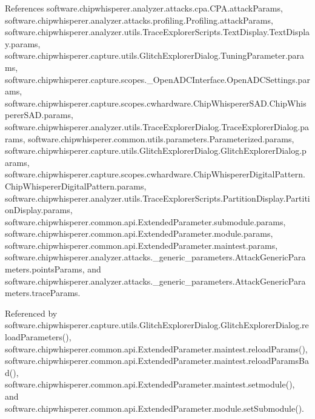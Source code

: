 References software.\+chipwhisperer.\+analyzer.\+attacks.\+cpa.\+C\+P\+A.\+attack\+Params, software.\+chipwhisperer.\+analyzer.\+attacks.\+profiling.\+Profiling.\+attack\+Params, software.\+chipwhisperer.\+analyzer.\+utils.\+Trace\+Explorer\+Scripts.\+Text\+Display.\+Text\+Display.\+params, software.\+chipwhisperer.\+capture.\+utils.\+Glitch\+Explorer\+Dialog.\+Tuning\+Parameter.\+params, software.\+chipwhisperer.\+capture.\+scopes.\+\_\+\+Open\+A\+D\+C\+Interface.\+Open\+A\+D\+C\+Settings.\+params, software.\+chipwhisperer.\+capture.\+scopes.\+cwhardware.\+Chip\+Whisperer\+S\+A\+D.\+Chip\+Whisperer\+S\+A\+D.\+params, software.\+chipwhisperer.\+analyzer.\+utils.\+Trace\+Explorer\+Dialog.\+Trace\+Explorer\+Dialog.\+params, software.\+chipwhisperer.\+common.\+utils.\+parameters.\+Parameterized.\+params, software.\+chipwhisperer.\+capture.\+utils.\+Glitch\+Explorer\+Dialog.\+Glitch\+Explorer\+Dialog.\+params, software.\+chipwhisperer.\+capture.\+scopes.\+cwhardware.\+Chip\+Whisperer\+Digital\+Pattern.\+Chip\+Whisperer\+Digital\+Pattern.\+params, software.\+chipwhisperer.\+analyzer.\+utils.\+Trace\+Explorer\+Scripts.\+Partition\+Display.\+Partition\+Display.\+params, software.\+chipwhisperer.\+common.\+api.\+Extended\+Parameter.\+submodule.\+params, software.\+chipwhisperer.\+common.\+api.\+Extended\+Parameter.\+module.\+params, software.\+chipwhisperer.\+common.\+api.\+Extended\+Parameter.\+maintest.\+params, software.\+chipwhisperer.\+analyzer.\+attacks.\+\_\+generic\+\_\+parameters.\+Attack\+Generic\+Parameters.\+points\+Params, and software.\+chipwhisperer.\+analyzer.\+attacks.\+\_\+generic\+\_\+parameters.\+Attack\+Generic\+Parameters.\+trace\+Params.



Referenced by software.\+chipwhisperer.\+capture.\+utils.\+Glitch\+Explorer\+Dialog.\+Glitch\+Explorer\+Dialog.\+reload\+Parameters(), software.\+chipwhisperer.\+common.\+api.\+Extended\+Parameter.\+maintest.\+reload\+Params(), software.\+chipwhisperer.\+common.\+api.\+Extended\+Parameter.\+maintest.\+reload\+Params\+Bad(), software.\+chipwhisperer.\+common.\+api.\+Extended\+Parameter.\+maintest.\+setmodule(), and software.\+chipwhisperer.\+common.\+api.\+Extended\+Parameter.\+module.\+set\+Submodule().


